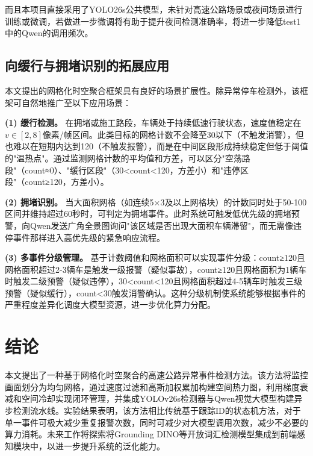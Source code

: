 \documentclass[10.5pt,a4paper,twoside,twocolumn]{ctexart}
\begin{document}
而且本项目直接采用了YOLO26s公共模型，未针对高速公路场景或夜间场景进行训练或微调，若做进一步微调将有助于提升夜间检测准确率，将进一步降低test1中的Qwen的调用频次。

\subsection{向缓行与拥堵识别的拓展应用}

本文提出的网格化时空聚合框架具有良好的场景扩展性。除异常停车检测外，该框架可自然地推广至以下应用场景：

\textbf{(1) 缓行检测。} 在拥堵或施工路段，车辆处于持续低速行驶状态，速度值稳定在$v\in[2,8]$像素/帧区间。此类目标的网格计数不会降至30以下（不触发消警），但也难以在短期内达到120（不触发报警），而是在中间区段形成持续稳定但低于阈值的"温热点"。通过监测网格计数的平均值和方差，可以区分"空荡路段"（count≈0）、"缓行区段"（30<count<120，方差小）和"违停区段"（count≥120，方差小）。

\textbf{(2) 拥堵识别。} 当大面积网格（如连续5×3及以上网格块）的计数同时处于50-100区间并维持超过60秒时，可判定为拥堵事件。此时系统可触发低优先级的拥堵预警，向Qwen发送广角全景图询问"该区域是否出现大面积车辆滞留"，而无需像违停事件那样进入高优先级的紧急响应流程。

\textbf{(3) 多事件分级管理。} 基于计数阈值和网格面积可以实现事件分级：count≥120且网格面积超过2-3辆车是触发一级报警（疑似事故），count≥120且网格面积为1辆车时触发二级预警（疑似违停），30<count<120且网格面积超过4-5辆车时触发三级预警（疑似缓行），count<30触发消警确认。这种分级机制使系统能够根据事件的严重程度差异化调度大模型资源，进一步优化算力分配。

\section{\heiti{} 结论}

本文提出了一种基于网格化时空聚合的高速公路异常事件检测方法。该方法将监控画面划分为均匀网格，通过速度过滤和高斯加权累加构建空间热力图，利用梯度衰减和空间冷却实现闭环管理，并集成YOLOv26s检测器与Qwen视觉大模型构建异步检测流水线。实验结果表明，该方法相比传统基于跟踪ID的状态机方法，对于单一事件可极大减少重复报警次数，同时可减少对大模型调用次数，减少不必要的算力消耗。未来工作将探索将Grounding DINO等开放词汇检测模型集成到前端感知模块中，以进一步提升系统的泛化能力。
\end{document}
